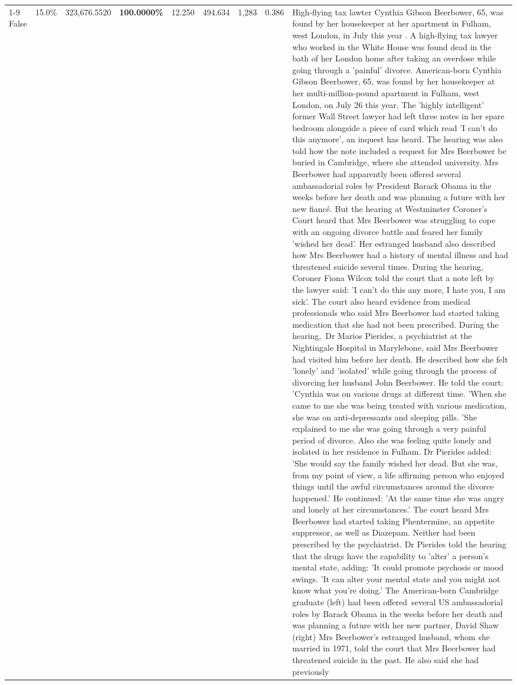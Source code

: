 \begin{table}[H]
\begin{tabular}{lllrlllll}
\cline{1-9}
False & 15.0\% & 323,676.5520 & \bfseries \color{red} 100.0000\% & 12.250 & 494.634 & 1,283 & 0.386 & High-flying tax lawter Cynthia Gibson Beerbower, 65, was found by her housekeeper at her apartment in Fulham, west London, in July this year . A high-flying tax lawyer who worked in the White House was found dead in the bath of her London home after taking an overdose while going through a 'painful' divorce. American-born Cynthia Gibson Beerbower, 65, was found by her housekeeper at her multi-million-pound apartment in Fulham, west London, on July 26 this year. The 'highly intelligent' former Wall Street lawyer had left three notes in her spare bedroom alongside a piece of card which read 'I can't do this anymore', an inquest has heard. The hearing was also told how the note included a request for Mrs Beerbower be buried in Cambridge, where she attended university. Mrs Beerbower had apparently been offered several ambassadorial roles by President Barack Obama in the weeks before her death and was planning a future with her new fiancé. But the hearing at Westminster Coroner's Court heard that Mrs Beerbower was struggling to cope with an ongoing divorce battle and feared her family 'wished her dead'. Her estranged husband also described how Mrs Beerbower had a history of mental illness and had threatened suicide several times. During the hearing, Coroner Fiona Wilcox told the court that a note left by the lawyer said: 'I can't do this any more, I hate you, I am sick'. The court also heard evidence from medical professionals who said Mrs Beerbower had started taking medication that she had not been prescribed. During the hearing, Dr Marios Pierides, a psychiatrist at the Nightingale Hospital in Marylebone, said Mrs Beerbower had visited him before her death. He described how she felt 'lonely' and 'isolated' while going through the process of divorcing her husband John Beerbower. He told the court: 'Cynthia was on various drugs at different time. 'When she came to me she was being treated with various medication, she was on anti-depressants and sleeping pills. 'She explained to me she was going through a very painful period of divorce. Also she was feeling quite lonely and isolated in her residence in Fulham. Dr Pierides added: 'She would say the family wished her dead. But she was, from my point of view, a life affirming person who enjoyed things until the awful circumstances around the divorce happened.' He continued: 'At the same time she was angry and lonely at her circumstances.' The court heard Mrs Beerbower had started taking Phentermine, an appetite suppressor, as well as Diazepam. Neither had been prescribed by the psychiatrist. Dr Pierides told the hearing that the drugs have the capability to 'alter' a person's mental state, adding: 'It could promote psychosis or mood swings. 'It can alter your mental state and you might not know what you're doing.' The American-born Cambridge graduate (left) had been offered several US ambassadorial roles by Barack Obama in the weeks before her death and was planning a future with her new partner, David Shaw (right) Mrs Beerbower's estranged husband, whom she married in 1971, told the court that Mrs Beerbower had threatened suicide in the past. He also said she had previously 
\end{tabular}
\end{table}
